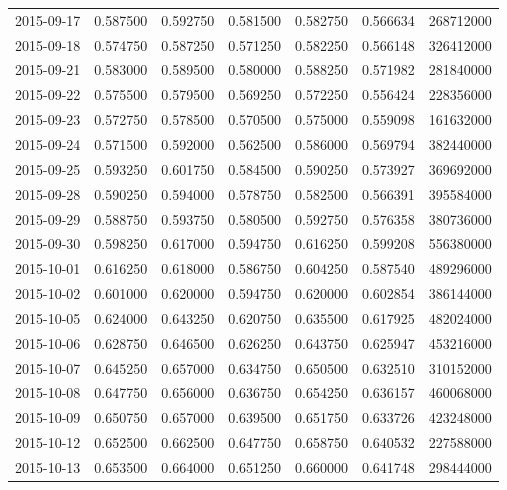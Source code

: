 \begin{tabular}{lrrrrrr}
2015-09-17 &    0.587500 &    0.592750 &    0.581500 &    0.582750 &    0.566634 &   268712000 \\
2015-09-18 &    0.574750 &    0.587250 &    0.571250 &    0.582250 &    0.566148 &   326412000 \\
2015-09-21 &    0.583000 &    0.589500 &    0.580000 &    0.588250 &    0.571982 &   281840000 \\
2015-09-22 &    0.575500 &    0.579500 &    0.569250 &    0.572250 &    0.556424 &   228356000 \\
2015-09-23 &    0.572750 &    0.578500 &    0.570500 &    0.575000 &    0.559098 &   161632000 \\
2015-09-24 &    0.571500 &    0.592000 &    0.562500 &    0.586000 &    0.569794 &   382440000 \\
2015-09-25 &    0.593250 &    0.601750 &    0.584500 &    0.590250 &    0.573927 &   369692000 \\
2015-09-28 &    0.590250 &    0.594000 &    0.578750 &    0.582500 &    0.566391 &   395584000 \\
2015-09-29 &    0.588750 &    0.593750 &    0.580500 &    0.592750 &    0.576358 &   380736000 \\
2015-09-30 &    0.598250 &    0.617000 &    0.594750 &    0.616250 &    0.599208 &   556380000 \\
2015-10-01 &    0.616250 &    0.618000 &    0.586750 &    0.604250 &    0.587540 &   489296000 \\
2015-10-02 &    0.601000 &    0.620000 &    0.594750 &    0.620000 &    0.602854 &   386144000 \\
2015-10-05 &    0.624000 &    0.643250 &    0.620750 &    0.635500 &    0.617925 &   482024000 \\
2015-10-06 &    0.628750 &    0.646500 &    0.626250 &    0.643750 &    0.625947 &   453216000 \\
2015-10-07 &    0.645250 &    0.657000 &    0.634750 &    0.650500 &    0.632510 &   310152000 \\
2015-10-08 &    0.647750 &    0.656000 &    0.636750 &    0.654250 &    0.636157 &   460068000 \\
2015-10-09 &    0.650750 &    0.657000 &    0.639500 &    0.651750 &    0.633726 &   423248000 \\
2015-10-12 &    0.652500 &    0.662500 &    0.647750 &    0.658750 &    0.640532 &   227588000 \\
2015-10-13 &    0.653500 &    0.664000 &    0.651250 &    0.660000 &    0.641748 &   298444000 \\

\end{tabular}
